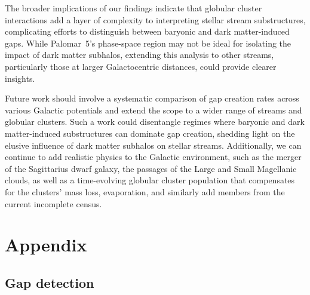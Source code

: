     The broader implications of our findings indicate that globular cluster interactions add a layer of complexity to interpreting stellar stream substructures, complicating efforts to distinguish between baryonic and dark matter-induced gaps. While Palomar~5's phase-space region may not be ideal for isolating the impact of dark matter subhalos, extending this analysis to other streams, particularly those at larger Galactocentric distances, could provide clearer insights. 

    Future work should involve a systematic comparison of gap creation rates across various Galactic potentials and extend the scope to a wider range of streams and globular clusters. Such a work could disentangle regimes where baryonic and dark matter-induced substructures can dominate gap creation, shedding light on the elusive influence of dark matter subhalos on stellar streams. Additionally, we can continue to add realistic physics to the Galactic environment, such as the merger of the Sagittarius dwarf galaxy, the passages of the Large and Small Magellanic clouds, as well as a time-evolving globular cluster population that compensates for the clusters' mass loss, evaporation, and similarly add members from the current incomplete census.

\section{Appendix}

    \subsection{Gap detection} \label{sec:gap_detection}

